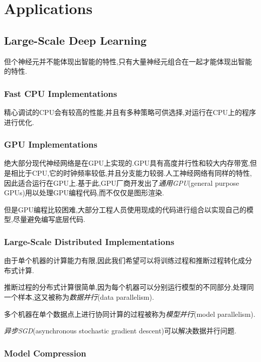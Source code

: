 \chapter{Applications}

\section{Large-Scale Deep Learning}

但个神经元并不能体现出智能的特性,只有大量神经元组合在一起才能体现出智能的特性.

\subsection{Fast CPU Implementations}

精心调试的CPU会有较高的性能,并且有多种策略可供选择,对运行在CPU上的程序进行优化.

\subsection{GPU Implementations}

绝大部分现代神经网络是在GPU上实现的.GPU具有高度并行性和较大内存带宽,但是相比于CPU,它的时钟频率较低,并且分支能力较弱.人工神经网络有同样的特性,因此适合运行在GPU上.基于此,GPU厂商开发出了\textit{通用GPU}(general purpose GPUs)用以处理GPU编程代码,而不仅仅是图形渲染.

但是GPU编程比较困难,大部分工程人员使用现成的代码进行组合以实现自己的模型,尽量避免编写底层代码.

\subsection{Large-Scale Distributed Implementations}

由于单个机器的计算能力有限,因此我们希望可以将训练过程和推断过程转化成分布式计算.

推断过程的分布式计算很简单,因为每个机器可以分别运行模型的不同部分,处理同一个样本,这又被称为\textit{数据并行}(data parallelism).

多个机器在单个数据点上进行协同计算的过程被称为\textit{模型并行}(model parallelism).

\textit{异步SGD}(asynchronous stochastic gradient descent)可以解决数据并行问题.

\subsection{Model Compression}


